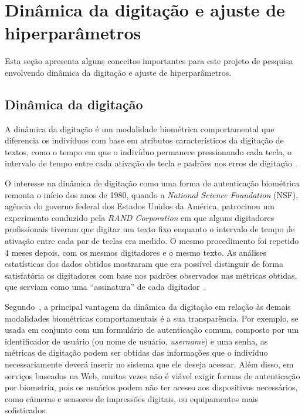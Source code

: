 \section{Dinâmica da digitação e ajuste de hiperparâmetros}\label{sec:relatedwork}

Esta seção apresenta alguns conceitos importantes para este projeto de pesquisa envolvendo dinâmica da digitação e ajuste de hiperparâmetros.

\subsection{Dinâmica da digitação}\label{subsec:dinamica_de_digitacao}

A dinâmica da digitação é um modalidade biométrica comportamental que diferencia os indivíduos com base em atributos característicos da digitação de textos, como o tempo em que o indivíduo permanece pressionando cada tecla, o intervalo de tempo entre cada ativação de tecla e padrões nos erros de digitação \cite{biometric_personal_auth_using_keystroke_dynamics}.

O interesse na dinâmica de digitação como uma forma de autenticação biométrica remonta o início dos anos de 1980, quando a \textit{National Science Foundation} (NSF), agência do governo federal dos Estados Unidos da América, patrocinou um experimento conduzido pela \textit{RAND Corporation} em que alguns digitadores profissionais tiveram que digitar um texto fixo enquanto o intervalo de tempo de ativação entre cada par de teclas era medido. O mesmo procedimento foi repetido 4 meses depois, com os mesmos digitadores e o mesmo texto. As análises estatísticas dos dados obtidos mostraram que era possível distinguir de forma satisfatória os digitadores com base nos padrões observados nas métricas obtidas, que serviam como uma ``assinatura'' de cada digitador~\cite{authentication_by_keystroke_timing}.

Segundo~, a principal vantagem da dinâmica da digitação em relação às demais modalidades biométricas comportamentais é a sua transparência. Por exemplo, se usada em conjunto com um formulário de autenticação comum, composto por um identificador de usuário (ou nome de usuário, \textit{username}) e uma senha, as métricas de digitação podem ser obtidas das informações que o indivíduo necessariamente deverá inserir no sistema que ele deseja acessar. Além disso, em serviços baseados na Web, muitas vezes não é viável exigir formas de autenticação por biometria, pois os usuários podem não ter acesso aos dispositivos necessários, como câmeras e sensores de impressões digitais, ou equipamentos mais sofisticados.

